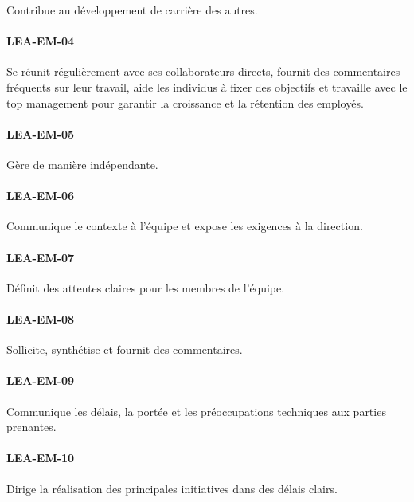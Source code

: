 \documentclass[a4paper, french, openany, 12pt]{book}
\newcommand\cha[1]{\textcolor{OliveGreen}{\textbf{\uppercase{lea-{#1}}}}}
\begin{document}
\begin{multicols}{2}
  Contribue au développement de carrière des autres.
  
  \paragraph*{\cha{em-04}}

  Se réunit régulièrement avec ses collaborateurs directs, fournit des commentaires fréquents sur leur travail, aide les
  individus à fixer des objectifs et travaille avec le top management pour garantir la  croissance et la rétention des 
  employés.

  \paragraph*{\cha{em-05}}

  Gère de manière indépendante.
  
  \paragraph*{\cha{em-06}}

  Communique le contexte à l'équipe et expose les exigences à la direction.

  \paragraph*{\cha{em-07}}

  Définit des attentes claires pour les membres de l'équipe.
  
  \paragraph*{\cha{em-08}}

  Sollicite, synthétise et fournit des commentaires.
  
  \paragraph*{\cha{em-09}}

  Communique les délais, la portée et les préoccupations techniques aux parties prenantes.
  
  \paragraph*{\cha{em-10}}

  Dirige la réalisation des principales initiatives dans des délais clairs.
  

\end{multicols}
\end{document}
